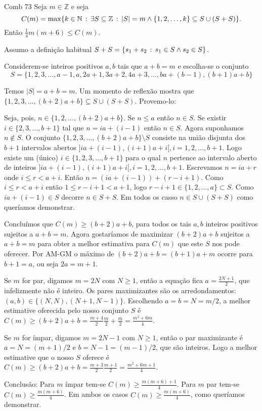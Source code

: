 \documentclass[repertorio-solutions-1.tex]{subfiles}
\begin{document}
\begin{problem}{Comb 73}
Seja $m\in\mathbb{Z}$ e seja
$$C(m)=\max\{k\in\mathbb{N}\,:\,\exists S\subseteq\mathbb{Z}
\,:\, |S|=m\wedge\{1,2,\dots,k\}\subseteq S\cup(S+S)\}.$$
Então $\frac{1}{4}m(m+6)\leq C(m)$.
\end{problem}

\begin{solution}
Assumo a definição habitual $S+S=\{s_1+s_2\,:\, s_1\in S \wedge s_2\in S\}$.

Considerem-se inteiros positivos $a,b$ tais que $a+b=m$ e escolha-se o conjunto
$$S=\{1,2,3,\dots,a-1,a,2a+1,3a+2,4a+3,\dots,ba+(b-1),(b+1)a+b\}$$

Temos $|S|=a+b=m$. Um momento de reflexão mostra que
$\{1,2,3,\dots,(b+2)a+b\}\subseteq S\cup(S+S)$. Provemo-lo:

\begin{anchor}
Seja, pois, $n\in\{1,2,\dots,(b+2)a+b\}$.
Se $n\leq a$ então $n\in S$.
Se existir $i\in\{2,3,\dots,b+1\}$ tal que $n=ia+(i-1)$ então $n\in S$.
Agora suponhamos $n\not\in S$.
O conjunto $\{1,2,3,\dots,(b+2)a+b\}\setminus S$ consiste na união disjunta dos $b+1$ intervalos abertos $]ia+(i-1),(i+1)a+i[, i=1,2,\dots,b+1$.
Logo existe um (único) $i\in\{1,2,3,\dots,b+1\}$ para o qual $n$ pertence ao intervalo aberto de inteiros $]ia+(i-1),(i+1)a+i[, i=1,2,\dots,b+1$.
Escrevamos $n=ia+r$ onde $i\leq r<a+i$. Então $n=(ia+(i-1))+(r-i+1)$.
Como $i\leq r<a+i$ então $1\leq r-i+1<a+1$, logo $r-i+1\in\{1,2,\dots,a\}\subset S$.
Como $ia+(i-1)\in S$ decorre $n\in S+S$. Em todos os casso $n\in S\cup(S+S)$ como queríamos demonstrar.
\end{anchor}

Concluímos que $C(m)\geq(b+2)a+b$, para todos os tais $a,b$ inteiros positivos sujeitos a $a+b=m$.
Agora gostaríamos de maximizar $(b+2)a+b$ sujeitos a $a+b=m$ para obter a melhor estimativa para $C(m)$ que este $S$ nos pode oferecer.
Por AM-GM o máximo de $(b+2)a+b=(b+1)a+m$ ocorre para $b+1=a$, ou seja $2a=m+1$.

Se $m$ for par, digamos $m=2N$ com $N\geq 1$, então a equação fica $a=\frac{2N+1}{2}$, que infelizmente não é inteiro.
Os pares maximizantes são os arredondamentos: $(a,b)\in\{(N,N),(N+1,N-1)\}$.
Escolhendo $a=b=N=m/2$, a melhor estimative oferecida pelo nosso conjunto $S$ é $C(m)\geq(b+2)a+b=\frac{m+4}{2}\frac{m}{2}+\frac{m}{2}=\frac{m^2+6m}{4}$.

Se $m$ for ímpar, digamos $m=2N-1$ com $N\geq 1$, então o par maximizante é $a=N=(m+1)/2$ e $b=N-1=(m-1)/2$, que são inteiros. Logo a melhor estimative que o nosso $S$ oferece é $C(m)\geq(b+2)a+b=\frac{m+3}{2}\frac{m+1}{2}=\frac{m^2+6m+1}{4}$.

Conclusão: Para $m$ ímpar tem-se $C(m)\geq\frac{m(m+6)+1}{4}$. Para $m$ par tem-se $C(m)\geq\frac{m(m+6)}{4}$. Em ambos os casos $C(m)\geq\frac{m(m+6)}{4}$, como queríamos demonstrar.
\end{solution}
\end{document}
